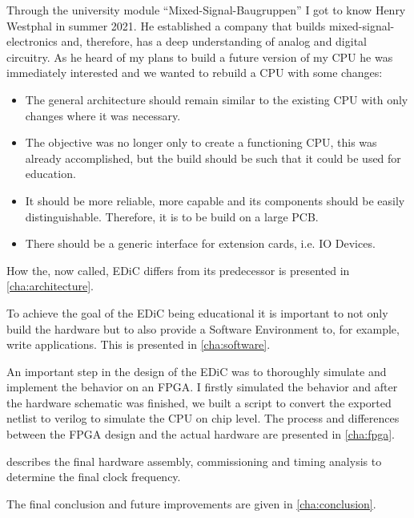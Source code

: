 Through the university module ``Mixed-Signal-Baugruppen'' I got to know Henry Westphal in summer 2021.
He established a company that builds mixed-signal-electronics and, therefore, has a deep understanding of analog and digital circuitry.
As he heard of my plans to build a future version of my \gls{CPU} he was immediately interested and we wanted to rebuild a \gls{CPU} with some changes:
\begin{itemize}
  \item The general architecture should remain similar to the existing \gls{CPU} with only changes where it was necessary.
  \item The objective was no longer only to create a functioning \gls{CPU}, this was already accomplished, but the build should be such that it could be used for education.
  \item It should be more reliable, more capable and its components should be easily distinguishable. Therefore, it is to be build on a large \gls{PCB}.
  \item There should be a generic interface for extension cards, i.e. IO Devices.
\end{itemize}
How the, now called, \gls{EDiC} differs from its predecessor is presented in \cref{cha:architecture}.

To achieve the goal of the \gls{EDiC} being educational it is important to not only build the hardware but to also provide a Software Environment to, for example, write applications.
This is presented in \cref{cha:software}.

An important step in the design of the \gls{EDiC} was to thoroughly simulate and implement the behavior on an \gls{FPGA}.
I firstly simulated the behavior and after the hardware schematic was finished, we built a script to convert the exported netlist to verilog to simulate the \gls{CPU} on chip level.
The process and differences between the \gls{FPGA} design and the actual hardware are presented in \cref{cha:fpga}.

 describes the final hardware assembly, commissioning and timing analysis to determine the final clock frequency.

The final conclusion and future improvements are given in \cref{cha:conclusion}.